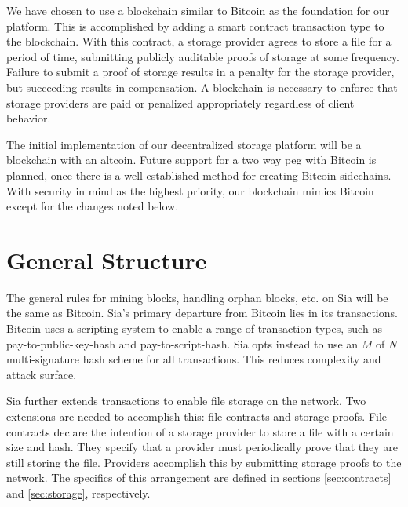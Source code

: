 \documentclass[twocolumn]{article}
\begin{document}
We have chosen to use a blockchain similar to Bitcoin \cite{btc, btcdg} as the foundation for our platform.
This is accomplished by adding a smart contract transaction type to the blockchain.
With this contract, a storage provider agrees to store a file for a period of time, submitting publicly auditable proofs of storage at some frequency.
Failure to submit a proof of storage results in a penalty for the storage provider, but succeeding results in compensation.
A blockchain is necessary to enforce that storage providers are paid or penalized appropriately regardless of client behavior.

The initial implementation of our decentralized storage platform will be a blockchain with an altcoin.
Future support for a two way peg with Bitcoin is planned, once there is a well established method for creating Bitcoin sidechains.
With security in mind as the highest priority, our blockchain mimics Bitcoin except for the changes noted below.

\section{General Structure}
The general rules for mining blocks, handling orphan blocks, etc. on Sia will be the same as Bitcoin.
Sia's primary departure from Bitcoin lies in its transactions.
Bitcoin uses a scripting system to enable a range of transaction types, such as pay-to-public-key-hash and pay-to-script-hash.
Sia opts instead to use an $M$ of $N$ multi-signature hash scheme for all transactions.
This reduces complexity and attack surface.

Sia further extends transactions to enable file storage on the network.
Two extensions are needed to accomplish this: file contracts and storage proofs.
File contracts declare the intention of a storage provider to store a file with a certain size and hash.
They specify that a provider must periodically prove that they are still storing the file.
Providers accomplish this by submitting storage proofs to the network.
The specifics of this arrangement are defined in sections \ref{sec:contracts} and \ref{sec:storage}, respectively.
\end{document}
